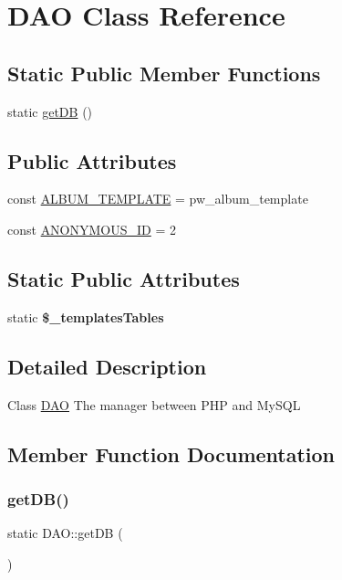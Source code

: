 \hypertarget{classDAO}{}\section{D\+AO Class Reference}
\label{classDAO}
\subsection*{Static Public Member Functions}
\begin{DoxyCompactItemize}
\item 
static \hyperlink{classDAO_a5baadea802b2521c1e1db8fbe91ec7f1}{get\+DB} ()
\end{DoxyCompactItemize}
\subsection*{Public Attributes}
\begin{DoxyCompactItemize}
\item 
const \hyperlink{classDAO_ae704b593e564a267bd5b2270387407cb}{A\+L\+B\+U\+M\+\_\+\+T\+E\+M\+P\+L\+A\+TE} = \textquotesingle{}pw\+\_\+album\+\_\+template\textquotesingle{}
\item 
const \hyperlink{classDAO_addd0b43ac0cf96e7df1db712042a3191}{A\+N\+O\+N\+Y\+M\+O\+U\+S\+\_\+\+ID} = 2
\end{DoxyCompactItemize}
\subsection*{Static Public Attributes}
\begin{DoxyCompactItemize}
\item 
static {\bfseries \$\+\_\+templates\+Tables}
\end{DoxyCompactItemize}


\subsection{Detailed Description}
Class \hyperlink{classDAO}{D\+AO} The manager between P\+HP and My\+S\+QL 

\subsection{Member Function Documentation}
\mbox{\label{classDAO_a5baadea802b2521c1e1db8fbe91ec7f1}} 
\subsubsection{\texorpdfstring{get\+D\+B()}{getDB()}}
{\footnotesize\ttfamily static D\+A\+O\+::get\+DB (\begin{DoxyParamCaption}{ }\end{DoxyParamCaption})\hspace{0.3cm}{\ttfamily [static]}}

